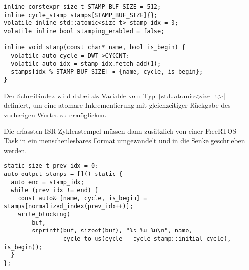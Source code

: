 \begin{code}
\begin{verbatim}
inline constexpr size_t STAMP_BUF_SIZE = 512;
inline cycle_stamp stamps[STAMP_BUF_SIZE]{};
volatile inline std::atomic<size_t> stamp_idx = 0;
volatile inline bool stamping_enabled = false;

inline void stamp(const char* name, bool is_begin) {
  volatile auto cycle = DWT->CYCCNT;
  volatile auto idx = stamp_idx.fetch_add(1);
  stamps[idx % STAMP_BUF_SIZE] = {name, cycle, is_begin};
}
\end{verbatim}
\end{code}

Der Schreibindex wird dabei als Variable vom Typ
\texttt|std::atomic<size_t>| definiert, um eine atomare Inkrementierung
mit gleichzeitiger Rückgabe des vorherigen Wertes zu ermöglichen.

%

Die erfassten ISR-Zyklenstempel müssen dann zusätzlich von einer FreeRTOS-Task
in ein menschenlesbares Format umgewandelt und in die Senke geschrieben werden.

\begin{code}
    \begin{verbatim}
static size_t prev_idx = 0;
auto output_stamps = []() static {
  auto end = stamp_idx;
  while (prev_idx != end) {
    const auto& [name, cycle, is_begin] = stamps[normalized_index(prev_idx++)];
    write_blocking(
        buf,
        snprintf(buf, sizeof(buf), "%s %u %u\n", name,
                 cycle_to_us(cycle - cycle_stamp::initial_cycle), is_begin));
  }
};
    \end{verbatim}
\end{code}

